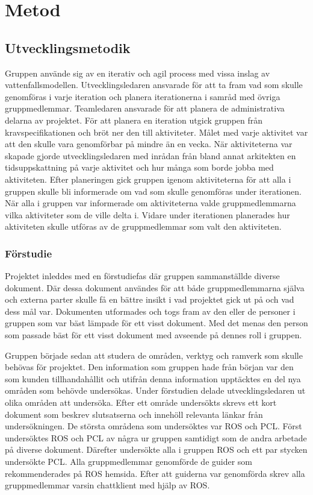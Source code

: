 \chapter{Metod}
\label{cha:method}

\section{Utvecklingsmetodik}

Gruppen använde sig av en iterativ och agil process med vissa inslag av vattenfallsmodellen. Utvecklingsledaren ansvarade för att ta fram vad som skulle genomföras i varje iteration och planera iterationerna i samråd med övriga gruppmedlemmar. Teamledaren ansvarade för att planera de administrativa delarna av projektet. För att planera en iteration utgick gruppen från kravspecifikationen och bröt ner den till aktiviteter. Målet med varje aktivitet var att den skulle vara genomförbar på mindre än en vecka. När aktiviteterna var skapade gjorde utvecklingsledaren med inrådan från bland annat arkitekten en tidsuppskattning på varje aktivitet och hur många som borde jobba med aktiviteten. Efter planeringen gick gruppen igenom aktiviteterna för att alla i gruppen skulle bli informerade om vad som skulle genomföras under iterationen. När alla i gruppen var informerade om aktiviteterna valde gruppmedlemmarna vilka aktiviteter som de ville delta i. Vidare under iterationen planerades hur aktiviteten skulle utföras av de gruppmedlemmar som valt den aktiviteten.

\subsection{Förstudie}

Projektet inleddes med en förstudiefas där gruppen sammanställde diverse dokument. Där dessa dokument användes för att både gruppmedlemmarna själva och externa parter skulle få en bättre insikt i vad projektet gick ut på och vad dess mål var. Dokumenten utformades och togs fram av den eller de personer i gruppen som var bäst lämpade för ett visst dokument. Med det menas den person som passade bäst för ett visst dokument med avseende på dennes roll i gruppen.

Gruppen började sedan att studera de områden, verktyg och ramverk som skulle behövas för projektet. Den information som gruppen hade från början var den som kunden tillhandahållit och utifrån denna information upptäcktes en del nya områden som behövde undersökas. Under förstudien delade utvecklingsledaren ut olika områden att undersöka. Efter ett område undersökts skrevs ett kort dokument som beskrev slutsatserna och innehöll relevanta länkar från undersökningen. De största områdena som undersöktes var ROS och PCL. Först undersöktes ROS och PCL av några ur gruppen samtidigt som de andra arbetade på diverse dokument. Därefter undersökte alla i gruppen ROS och ett par stycken undersökte PCL. Alla gruppmedlemmar genomförde de guider som rekommenderades på ROS hemsida. Efter att guiderna var genomförda skrev alla gruppmedlemmar varsin chattklient med hjälp av ROS.

